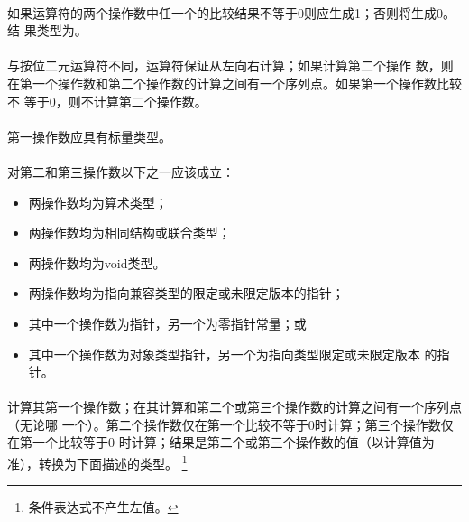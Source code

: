 \semantic
\paragraph{}
如果\tm{||}运算符的两个操作数中任一个的比较结果不等于0则应生成1；否则将生成0。结
果类型为。

\paragraph{}
与按位二元\tm{|}运算符不同，\tm{||}运算符保证从左向右计算；如果计算第二个操作
数，则在第一个操作数和第二个操作数的计算之间有一个序列点。如果第一个操作数比较不
等于0，则不计算第二个操作数。

\syntax
\paragraph{}

\constraint
\paragraph{}
第一操作数应具有标量类型。

\paragraph{}
对第二和第三操作数以下之一应该成立：
\begin{itemize}
  \item{两操作数均为算术类型；}
  \item{两操作数均为相同结构或联合类型；}
  \item{两操作数均为void类型。}
  \item{两操作数均为指向兼容类型的限定或未限定版本的指针；}
  \item{其中一个操作数为指针，另一个为零指针常量；或}
  \item{其中一个操作数为对象类型指针，另一个为指向类型限定或未限定版本
    的指针。}
\end{itemize}

\semantic
\paragraph{}
计算其第一个操作数；在其计算和第二个或第三个操作数的计算之间有一个序列点（无论哪
一个）。第二个操作数仅在第一个比较不等于0时计算；第三个操作数仅在第一个比较等于0
时计算；结果是第二个或第三个操作数的值（以计算值为准），转换为下面描述的类型。
\footnote{条件表达式不产生左值。}

